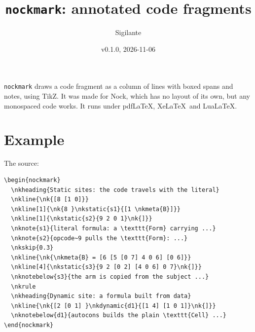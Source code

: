 \documentclass{article}
\title{\texttt{nockmark}: annotated code fragments}
\author{Sigilante}
\date{v0.1.0, 2026-11-06}
\begin{document}
\maketitle

\texttt{nockmark} draws a code fragment as a column of lines with boxed spans
and notes, using TikZ.  It was made for Nock, which has no layout of its own,
but any monospaced code works.  It runs under pdf\LaTeX, Xe\LaTeX\ and
Lua\LaTeX.

\section{Example}

\begin{center}
\begin{nockmark}
  \nkline{\nk{[8 [1 0]}}
  \nkline[1]{\nkstatic{s2}{9 2 0 1}\nk{]}}
  \nkline{\nk{\nkmeta{B} = [6 [5 [0 7] 4 0 6] [0 6]}}
  \nkline[4]{\nkstatic{s3}{9 2 [0 2] [4 0 6] 0 7}\nk{]}}
  \nkrule
  \nkline{\nk{[2 [0 1] }\nkdynamic{d1}{[1 4] [1 0 1]}\nk{]}}
\end{nockmark}
\end{center}

\noindent The source:
\begin{lstlisting}
\begin{nockmark}
  \nkheading{Static sites: the code travels with the literal}
  \nkline{\nk{[8 [1 0]}}
  \nkline[1]{\nk{8 }\nkstatic{s1}{[1 \nkmeta{B}]}}
  \nkline[1]{\nkstatic{s2}{9 2 0 1}\nk{]}}
  \nknote{s1}{literal formula: a \texttt{Form} carrying ...}
  \nknote{s2}{opcode~9 pulls the \texttt{Form}: ...}
  \nkskip{0.3}
  \nkline{\nk{\nkmeta{B} = [6 [5 [0 7] 4 0 6] [0 6]}}
  \nkline[4]{\nkstatic{s3}{9 2 [0 2] [4 0 6] 0 7}\nk{]}}
  \nknotebelow{s3}{the arm is copied from the subject ...}
  \nkrule
  \nkheading{Dynamic site: a formula built from data}
  \nkline{\nk{[2 [0 1] }\nkdynamic{d1}{[1 4] [1 0 1]}\nk{]}}
  \nknotebelow{d1}{autocons builds the plain \texttt{Cell} ...}
\end{nockmark}
\end{lstlisting}
\end{document}
